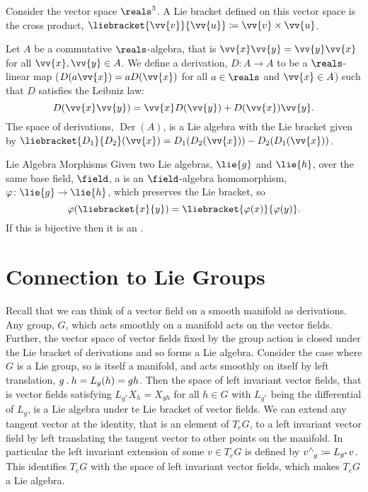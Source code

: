 Consider the vector space \(\reals^3\).
A Lie bracket defined on this vector space is the cross product, \(\liebracket{\vv{v}}{\vv{u}} \coloneqq \vv{v} \times \vv{u}\).

Let \(A\) be a commutative \(\reals\)-algebra, that is \(\vv{x}\vv{y} = \vv{y}\vv{x}\) for all \(\vv{x}, \vv{y} \in A\).
We define a derivation, \(D \colon A \to A\) to be a \(\reals\)-linear map (\(D(a\vv{x}) = aD(\vv{x})\) for all \(a \in \reals\) and \(\vv{x} \in A\)) such that \(D\) satisfies the Leibniz law:
\begin{equation}
    D(\vv{x}\vv{y}) = \vv{x}D(\vv{y}) + D(\vv{x})\vv{y}.
\end{equation}
The space of derivations, \(\mathop{\mathrm{Der}}(A)\), is a Lie algebra with the Lie bracket given by \(\liebracket{D_1}{D_2}(\vv{x}) = D_1(D_2(\vv{x})) - D_2(D_1(\vv{x}))\).

\begin{dfn}{Lie Algebra Morphisms}{}
    Given two Lie algebras, \(\lie{g}\) and \(\lie{h}\), over the same base field, \(\field\), a  is an \(\field\)-algebra homomorphism, \(\varphi\colon \lie{g} \to \lie{h}\), which preserves the Lie bracket, so
    \begin{equation}
        \varphi(\liebracket{x}{y}) = \liebracket{\varphi(x)}{\varphi(y)}.
    \end{equation}
    If this is bijective then it is an .
\end{dfn}

\section{Connection to Lie Groups}
Recall that we can think of a vector field on a smooth manifold as derivations.
Any group, \(G\), which acts smoothly on a manifold acts on the vector fields.
Further, the vector space of vector fields fixed by the group action is closed under the Lie bracket of derivations and so forms a Lie algebra.
Consider the case where \(G\) is a Lie group, so is itself a manifold, and acts smoothly on itself by left translation, \(g\mathbin{.} h = L_g(h) = gh\).
Then the space of left invariant vector fields, that is vector fields satisfying \(L_{g^*}X_h = X_{gh}\) for all \(h \in G\) with \(L_{g^*}\) being the differential of \(L_g\), is a Lie algebra under te Lie bracket of vector fields.
We can extend any tangent vector at the identity, that is an element of \(T_eG\), to a left invariant vector field by left translating the tangent vector to other points on the manifold.
In particular the left invariant extension of some \(v \in T_eG\) is defined by \(\tensor{v}{^\wedge_g} \coloneqq L_{g^*}v\).
This identifies \(T_eG\) with the space of left invariant vector fields, which makes \(T_eG\) a Lie algebra.

